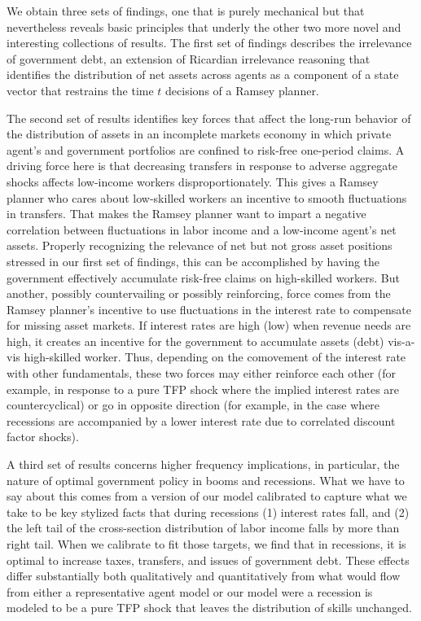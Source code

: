 \documentclass[thmsb,11pt]{article}
\begin{document}
We obtain  three sets of findings, one that is purely mechanical but that nevertheless reveals basic principles that underly the other two more novel and interesting collections of results.
The first set of findings describes the irrelevance of government debt, an extension of Ricardian irrelevance reasoning that
identifies the distribution of net assets across agents as a component of a  state vector that restrains the time $t$ decisions
of a Ramsey planner.

The second set of results identifies key forces  that affect the  long-run behavior of the distribution of assets in
an  incomplete markets economy in which private agent's and  government portfolios are confined to risk-free one-period claims.
A driving force here is  that decreasing transfers in response to adverse aggregate shocks affects low-income workers disproportionately. This gives a Ramsey planner who cares about low-skilled workers an incentive
 to smooth  fluctuations in transfers.  That makes  the Ramsey planner  want to impart a negative correlation between   fluctuations
in  labor income and a low-income  agent's net assets.  Properly recognizing the relevance  of net but not gross asset positions stressed in
our first set of findings, this  can be accomplished by having the  government  effectively accumulate risk-free claims on high-skilled workers.
But another, possibly countervailing or possibly reinforcing,  force  comes from the Ramsey planner's incentive to  use fluctuations in the  interest rate to compensate for missing asset markets. If interest rates are high (low) when revenue needs are high, it creates an incentive  for the government to accumulate assets (debt) vis-a-vis high-skilled worker.
Thus, depending on the comovement of the interest rate with other fundamentals, these two forces  may either reinforce each other (for example, in response to  a pure TFP shock where the implied interest rates are countercyclical) or go in  opposite direction (for example,
in the case where recessions are accompanied by a lower interest rate due to correlated discount factor shocks).

A third set of results concerns higher frequency implications, in particular,  the nature of  optimal government policy in booms and recessions.
What we have to say about this comes from a  version of our model calibrated to capture what we take to be
key  stylized facts  that during recessions  (1) interest rates fall, and (2) the left tail of the cross-section distribution of labor income falls by more than right tail.
 When we calibrate  to fit those targets, we find that in recessions, it is  optimal to increase taxes, transfers, and issues of
 government debt. %
  These effects differ substantially both qualitatively and quantitatively from what would flow from either a
  representative agent model or our model were a  recession is modeled to be a pure TFP shock that leaves the distribution of skills unchanged.
\end{document}
